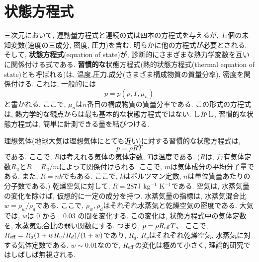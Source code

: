 \section{状態方程式}
三次元において, 運動量方程式と連続の式は四本の方程式を与えるが, 五個の未知変数(速度の三成分, 密度, 圧力)を含む. 
明らかに他の方程式が必要とされる. 
そして, \textbf{状態方程式}(equation of state)が, 診断的にさまざまな熱力学変数を互いに関係付ける式である. 
\textbf{習慣的な}状態方程式(熱的状態方程式(thermal equation of state)とも呼ばれる)は, 
温度,圧力,成分(さまざま構成物質の質量分率), 密度を関係付ける. 
これは, 一般的には
\begin{equation}
 p = p(\rho, T, \mu_n)
\end{equation}
と書かれる. 
ここで, $\mu_n$は$n$番目の構成物質の質量分率である. 
この形式の方程式は, 熱力学的な観点からは最も基本的な状態方程式ではない. 
しかし, 習慣的な状態方程式は, 簡単に計測できる量を結びつける. 

理想気体(地球大気は理想気体にとても近い)に対する習慣的な状態方程式は, 
\begin{equation}
 p = \rho R T 
 \label{eq:conventionalEOS_forIdealGas}
\end{equation}
である. 
ここで, $R$は考えれる気体の気体定数, $T$は温度である. 
($R$は, 万有気体定数$R_u$と$R = R_u/m$によって関係付けられる. ここで, $m$は気体成分の平均分子量である. 
また, $R=nk$でもある. ここで, $k$はボルツマン定数, $n$は単位質量あたりの分子数である.)
乾燥空気に対して, $R=287$J kg$^{-1}$ K$^{-1}$である. 
空気は, 水蒸気量の変化を除けば, 仮想的に一定の成分を持つ. 
水蒸気量の指標は, 水蒸気混合比$w=\rho_w/\rho_d$である. 
ここで, $\rho_w, \rho_d$はそれぞれ水蒸気と乾燥空気の密度である. 
大気では, $w$は 0 から　0.03 の間を変化する. 
この変化は, 状態方程式中の気体定数を, 水蒸気混合比の弱い関数にする. 
つまり, $p = \rho R_{\rm eff} T$、 
ここで, $R_{\rm eff}=R_d ( 1+ w R_v/R_d)/(1+w)$であり, 
$R_d$, $R_v$はそれぞれ乾燥空気, 水蒸気に対する気体定数である. 
$w \sim 0.01$なので, $R_{\rm eff}$の変化は極めて小さく, 理論的研究ではしばしば無視される. 

